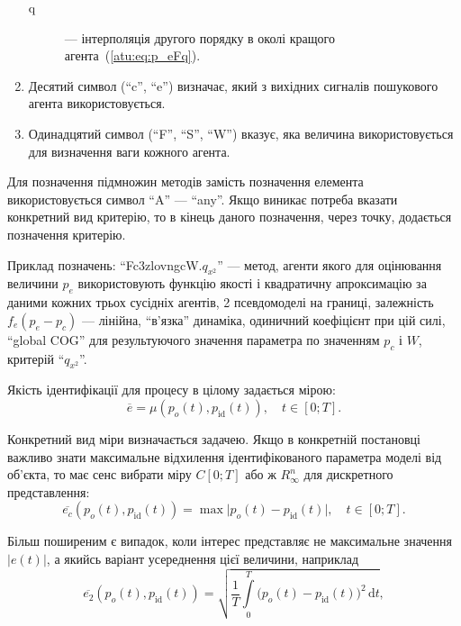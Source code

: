 \documentclass[a4paper,13pt]{atuaref}
\begin{document}
\begin{enumerate}
\begin{description}
      \item[q] ---
        інтерполяція другого порядку в околі кращого агента~(\ref{atu:eq:p_eFq}).

    \end{description}

  \item
    Десятий символ (``c'', ``e'') визначає, який з вихідних сигналів пошукового агента використовується.

  \item
    Одинадцятий символ (``F'', ``S'', ``W'') вказує,
    яка величина використовується для визначення ваги кожного агента.


\end{enumerate}
%
Для позначення підмножин методів замість позначення елемента використовується символ ``A'' --- ``any''.
Якщо виникає потреба вказати конкретний вид критерію, то в кінець даного
позначення, через точку, додається позначення критерію.

Приклад позначень:
``Fc3zlovngcW.$q_{x^2}$''
--- метод, агенти якого для оцінювання величини $p_e$ використовують функцію
якості і квадратичну апроксимацію за даними кожних трьох сусідніх агентів, 2
псевдомоделі на границі, залежність $f_e (p_e-p_c)$ --- лінійна, ``в'язка''
динаміка, одиничний коефіцієнт при цій силі, ``global COG'' для результуючого
значення параметра по значенням $p_c$ і $W$, критерій
``$q_{x^2}$''.


Якість ідентифікації для процесу в цілому задається мірою:
%
\[
  \overline{e} = \mu( p_o(t), p_\mathrm{id}(t) ),
  \quad
  t \in [0;T].
\]

Конкретний вид міри визначається задачею. Якщо в конкретній постановці
важливо знати максимальне відхилення ідентифікованого параметра моделі від
об'єкта, то має сенс вибрати міру $C[0; T]$ або ж $ R_{\infty}^n$ для
дискретного представлення:
%
\begin{equation}
  \overline{e_c}(p_o(t),p_\mathrm{id}(t))
  =
  \max \big| p_o(t)-p_\mathrm{id}(t) \big|,
  \quad
  t \in [0;T].
  \label{atu:eq:e_c}
\end{equation}

Більш поширеним є випадок, коли інтерес представляє не максимальне значення
$|e(t)|$, а якийсь варіант усереднення цієї величини, наприклад
%
\begin{equation}
  \overline{e_2}(p_o(t),p_\mathrm{id}(t))
  =
  \sqrt{ \frac{1}{T} \int\limits_{0}^{T} \big( p_o(t)-p_\mathrm{id}(t) \big)^2 \, \mathrm{d}t },
  \label{atu:eq:e_2}
\end{equation}
\end{document}
